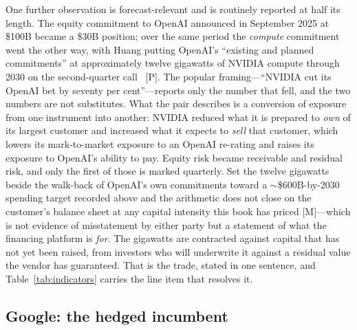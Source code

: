 One further observation is forecast-relevant and is routinely reported at half its length. The equity commitment to OpenAI announced in September 2025 at \$100B became a \$30B position; over the same period the \emph{compute} commitment went the other way, with Huang putting OpenAI's ``existing and planned commitments'' at approximately twelve gigawatts of NVIDIA compute through 2030 on the second-quarter call~\cite{nvda-huang-q2} [P]. The popular framing---``NVIDIA cut its OpenAI bet by seventy per cent''---reports only the number that fell, and the two numbers are not substitutes. What the pair describes is a conversion of exposure from one instrument into another: NVIDIA reduced what it is prepared to \emph{own} of its largest customer and increased what it expects to \emph{sell} that customer, which lowers its mark-to-market exposure to an OpenAI re-rating and raises its exposure to OpenAI's ability to pay. Equity risk became receivable and residual risk, and only the first of those is marked quarterly. Set the twelve gigawatts beside the walk-back of OpenAI's own commitments toward a $\sim$\$600B-by-2030 spending target recorded above and the arithmetic does not close on the customer's balance sheet at any capital intensity this book has priced [M]---which is not evidence of misstatement by either party but a statement of what the financing platform is \emph{for}. The gigawatts are contracted against capital that has not yet been raised, from investors who will underwrite it against a residual value the vendor has guaranteed. That is the trade, stated in one sentence, and Table~\ref{tab:indicators} carries the line item that resolves it.

\subsection{Google: the hedged incumbent}

